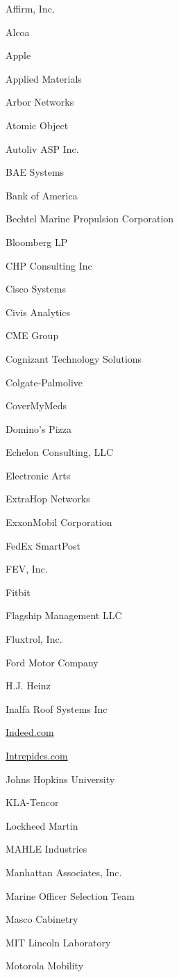 \documentclass[twoside]{article}
\begin{document}
\begin{center}
\begin{multicols}{5}
\begin{FlushLeft}
\begin{compactitem}
\item Affirm, Inc.
\item Alcoa
\item Apple
\item Applied Materials
\item Arbor Networks
\item Atomic Object
\item Autoliv ASP Inc.
\item BAE Systems
\item Bank of America
\item Bechtel Marine Propulsion Corporation
\item Bloomberg LP
\item CHP Consulting Inc
\item Cisco Systems
\item Civis Analytics
\item CME Group
\item Cognizant Technology Solutions
\item Colgate-Palmolive
\item CoverMyMeds
\item Domino's Pizza
\item Echelon Consulting, LLC
\item Electronic Arts
\item ExtraHop Networks
\item ExxonMobil Corporation
\item FedEx SmartPost
\item FEV, Inc.
\item Fitbit
\item Flagship Management LLC
\item Fluxtrol, Inc.
\item Ford Motor Company
\item H.J. Heinz
\item Inalfa Roof Systems Inc
\item \url{Indeed.com}
\item \url{Intrepidcs.com}
\item Johns Hopkins University
\item KLA-Tencor
\item Lockheed Martin
\item MAHLE Industries
\item Manhattan Associates, Inc.
\item Marine Officer Selection Team
\item Masco Cabinetry
\item MIT Lincoln Laboratory
\item Motorola Mobility

\end{compactitem}
\end{FlushLeft}
\end{multicols}
\end{center}
\end{document}
